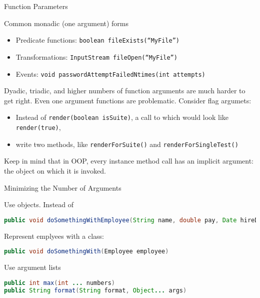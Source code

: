 \documentclass{beamer}
\begin{document}
\begin{frame}[fragile]{Function Parameters}


Common monadic (one argument) forms
\begin{itemize}
\item Predicate functions: {\tt boolean fileExists(``MyFile'')}
\item Transformations: {\tt InputStream fileOpen(``MyFile'')}
\item Events: {\tt void passwordAttemptFailedNtimes(int attempts)}
\end{itemize}

Dyadic, triadic, and higher numbers of function arguments are much harder to get right.  Even one argument functions are problematic.  Consider flag argumets:
\begin{itemize}
\item Instead of {\tt render(boolean isSuite)}, a call to which would look like {\tt render(true)}, 
\item write two methods, like {\tt renderForSuite()} and {\tt renderForSingleTest()}
\end{itemize}

Keep in mind that in OOP, every instance method call has an implicit argument: the object on which it is invoked.
\end{frame}

\begin{frame}[fragile]{Minimizing the Number of Arguments}


Use objects.  Instead of
\begin{lstlisting}[language=Java]
public void doSomethingWithEmployee(String name, double pay, Date hireDate)
\end{lstlisting}
Represent emplyees with a class:
\begin{lstlisting}[language=Java]
public void doSomethingWith(Employee employee)
\end{lstlisting}

Use argument lists
\begin{lstlisting}[language=Java]
public int max(int ... numbers)
public String format(String format, Object... args)
\end{lstlisting}


\end{frame}
\end{document}
